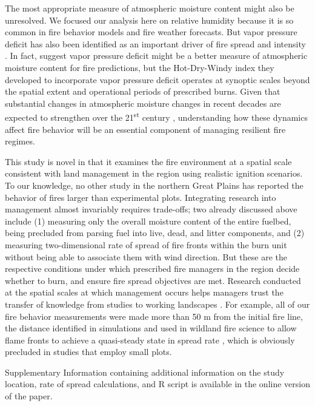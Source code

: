 \documentclass[referee, 
		     sn-basic]{sn-jnl}
\begin{document}
\begin{linenumbers}
The most appropriate measure of atmospheric moisture content might also
be unresolved. We focused our analysis here on relative humidity because
it is so common in fire behavior models and fire weather forecasts. But
vapor pressure deficit has also been identified as an important driver
of fire spread and intensity \citep{gomes2020}. In fact,
\citet{srock2018} suggest vapor pressure deficit might be a better
measure of atmospheric moisture content for fire predictions, but the
Hot-Dry-Windy index they developed to incorporate vapor pressure deficit
operates at synoptic scales beyond the spatial extent and operational
periods of prescribed burns. Given that substantial changes in
atmospheric moisture changes in recent decades are expected to
strengthen over the 21\textsuperscript{st} century
\citep{seager2015, ficklin2017}, understanding how these dynamics affect
fire behavior will be an essential component of managing resilient fire
regimes.

This study is novel in that it examines the fire environment at a spatial scale consistent with land management in the region using
realistic ignition scenarios. 
To our knowledge, no other study in the northern Great Plains has reported the behavior of fires larger than experimental plots. Integrating research into management almost invariably requires trade-offs; two already discussed above include (1)
measuring only the overall moisture content of the entire fuelbed, being
precluded from parsing fuel into live, dead, and litter components, and
(2) measuring two-dimensional rate of spread of fire fronts within the
burn unit without being able to associate them with wind direction. But
these are the respective conditions under which prescribed fire managers
in the region decide whether to burn, and ensure fire spread objectives
are met. Research conducted at the spatial scales at which management
occurs helps managers trust the transfer of knowledge from studies to
working landscapes \citep{sayre2005, cacciapaglia2012}. For example, all
of our fire behavior measurements were made more than 50 m from the
initial fire line, the distance identified in simulations and used in
wildland fire science to allow flame fronts to achieve a quasi-steady
state in spread rate \citep{fernandes2000, sutherland2020}, which is
obviously precluded in studies that employ small plots.

\backmatter


Supplementary Information containing additional information on the study location, rate of spread calculations, and \textsf{R} script is available in the online version of the paper.


\end{linenumbers}
\end{document}

